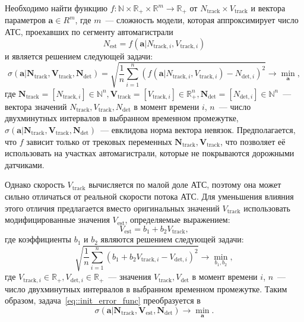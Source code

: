Необходимо найти функцию $f: \mathbb{N}\times\mathbb{R}_{+}\times\mathbb{R}^m \rightarrow \mathbb{R}_{+}$ от $N_\text{track}\times V_\text{track}$ и вектора параметров $\mathbf{a} \in R^m$, где $m$~--- сложность модели, которая аппроксимирует число АТС, проехавших по сегменту автомагистрали
\begin{equation}
    N_\text{est} = f(\mathbf{a} | N_{\text{track}, i}, V_{\text{track}, i})
    \label{eq::func_def}
\end{equation}
и является решением следующей задачи:
\begin{equation}
    \sigma(\mathbf{a} | \mathbf{N}_\text{track}, \mathbf{V}_\text{track}, \mathbf{N}_\text{det}) = \sqrt{\frac{1}{n}\sum_{i=1}^n (f(\mathbf{a} | N_{\text{track}, i}, V_{\text{track}, i} ) - N_{\text{det}, i})^2} \rightarrow \min_{\mathbf{a}},
    \label{eq::init_error_func}
\end{equation}
где $\mathbf{N}_\text{track} = [N_{\text{track}, i}] \in \mathbb{N}^{n}, \mathbf{V}_\text{track} = [V_{\text{track}, i}] \in \mathbb{R}_{+}^{n}, \mathbf{N}_\text{det} = [N_{\text{det}, i}] \in \mathbb{N}^{n}$~--- вектора значений $N_\text{track}, V_\text{track}, N_\text{det}$ в момент времени $i$, $n$~--- число двухминутных интервалов в выбранном временном промежутке, $\sigma(\mathbf{a} | \mathbf{N}_\text{track}, \mathbf{V}_\text{track}, \mathbf{N}_\text{det})$~--- евклидова норма вектора невязок.
Предполагается, что $f$ зависит только от трековых переменных $\mathbf{N}_\text{track}, \mathbf{V}_\text{track}$, что позволяет её использовать на участках автомагистрали, которые не покрываются дорожными датчиками.

Однако скорость $V_\text{track}$ вычисляется по малой доле АТС, поэтому она может сильно отличаться от реальной скорости потока АТС.
Для уменьшения влияния этого отличия предлагается вместо оригинальных значений $V_\text{track}$ использовать модифицированные значения $V_\text{est}$, определяемые выражением:
\[
V_\text{est} = b_1 + b_2V_\text{track},
\]
где коэффициенты $b_1$ и $b_2$ являются решением следующей задачи:
\begin{equation}
    \sqrt{\frac{1}{n}\sum_{i=1}^n (b_1 + b_2V_{\text{track}, i} - V_{\text{det}, i})^2} \rightarrow \min_{b_1, b_2},
    \label{eq::speed_error_function}
\end{equation}
где $V_{\text{track}, i} \in \mathbb{R}_{+}, V_{\text{det}, i} \in \mathbb{R}_{+}$~--- значения $V_\text{track}, V_\text{det}$ в момент времени $i$, $n$~--- число двухминутных интервалов в выбранном временном промежутке.
Таким образом, задача~\eqref{eq::init_error_func} преобразуется в
\begin{equation}
    \sigma(\mathbf{a}|\mathbf{N}_\text{track}, \mathbf{V}_\text{est}, \mathbf{N}_\text{det}) \rightarrow \min_{\mathbf{a}}.
    \label{eq::complex_error_func}
\end{equation}

